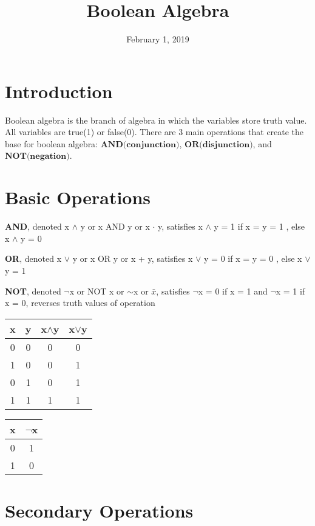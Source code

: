 \documentclass{pset_template}
\title{Boolean Algebra}
\date{February 1, 2019}
\begin{document}
\maketitle

\section{Introduction}
Boolean algebra is the branch of algebra in which the variables store truth value. All variables are true(1) or false(0).
There are 3 main operations that create the base for boolean algebra: $\textbf{AND(conjunction)}$, $\textbf{OR(disjunction)}$, and $\textbf{NOT(negation)}$.

\bigskip
\noindent
\section{Basic Operations}
\textbf{AND}, denoted x $\land$ y or x AND y or x $\cdot$ y, satisfies x $\land$ y = 1 if x = y = 1 , else x $\land$ y = 0

\noindent
\textbf{OR}, denoted x $\lor$ y or x OR y or x + y, satisfies x $\lor$ y = 0 if x = y = 0 , else x $\lor$ y = 1

\noindent
\textbf{NOT}, denoted $\neg$x or NOT x or $\sim$x or $\bar{x}$, satisfies $\neg$x = 0 if x = 1 and $\neg$x = 1 if x = 0, reverses truth values of operation

\begin{center}
\begin{tabular}{ |c|c|c|c| }
 \hline
 x & y & x$\land$y & x$\lor$y \\
 \hline
  0 & 0 & 0 & 0 \\
 \hline
 1 & 0 & 0 & 1 \\
 \hline
 0 & 1 & 0 & 1 \\
 \hline
 1 & 1 & 1 & 1 \\
 \hline
\end{tabular}
\end{center}

\begin{center}
\begin{tabular}{ |c|c| }
 \hline
 x & $\neg$x \\
 \hline
  0 & 1  \\
 \hline
 1 & 0 \\
 \hline
\end{tabular}
\end{center}

\section{Secondary Operations}
\end{document}
